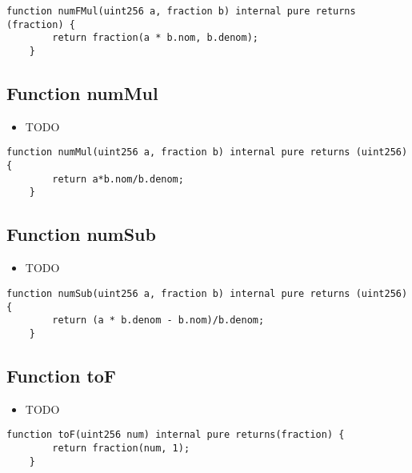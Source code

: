 \begin{lstlisting}[firstnumber=106]
    function numFMul(uint256 a, fraction b) internal pure returns (fraction) {
        return fraction(a * b.nom, b.denom);
    }
\end{lstlisting}

\subsection{Function numMul}

\noindent\begin{itemize}
\item TODO
\end{itemize}

\begin{lstlisting}[firstnumber=102]
    function numMul(uint256 a, fraction b) internal pure returns (uint256) {
        return a*b.nom/b.denom;
    }
\end{lstlisting}

\subsection{Function numSub}

\noindent\begin{itemize}
\item TODO
\end{itemize}

\begin{lstlisting}[firstnumber=118]
    function numSub(uint256 a, fraction b) internal pure returns (uint256) {
        return (a * b.denom - b.nom)/b.denom;
    }
\end{lstlisting}

\subsection{Function toF}

\noindent\begin{itemize}
\item TODO
\end{itemize}

\begin{lstlisting}[firstnumber=122]
    function toF(uint256 num) internal pure returns(fraction) {
        return fraction(num, 1);
    }
\end{lstlisting}
